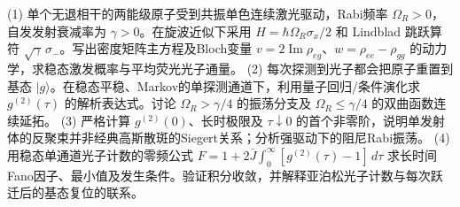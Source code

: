 (1) 单个无退相干的两能级原子受到共振单色连续激光驱动，Rabi频率 \(\Omega_R>0\)，自发发射衰减率为 \(\gamma>0\)。在旋波近似下采用 \(H=\hbar\Omega_R\sigma_x/2\) 和 Lindblad 跳跃算符 \(\sqrt\gamma\,\sigma_-\)。写出密度矩阵主方程及Bloch变量 \(v=2\operatorname{Im}\rho_{eg}\)、\(w=\rho_{ee}-\rho_{gg}\) 的动力学，求稳态激发概率与平均荧光光子通量。
(2) 每次探测到光子都会把原子重置到基态 \(|g\rangle\)。在稳态平稳、Markov的单探测通道下，利用量子回归/条件演化求 \(g^{(2)}(\tau)\) 的解析表达式。讨论 \(\Omega_R>\gamma/4\) 的振荡分支及 \(\Omega_R\le\gamma/4\) 的双曲函数连续延拓。
(3) 严格计算 \(g^{(2)}(0)\)、长时极限及 \(\tau\downarrow0\) 的首个非零阶，说明单发射体的反聚束并非经典高斯散斑的Siegert关系；分析强驱动下的阻尼Rabi振荡。
(4) 用稳态单通道光子计数的零频公式 \(F=1+2\bar J\int_0^\infty[g^{(2)}(\tau)-1]\,d\tau\) 求长时间Fano因子、最小值及发生条件。验证积分收敛，并解释亚泊松光子计数与每次跃迁后的基态复位的联系。
